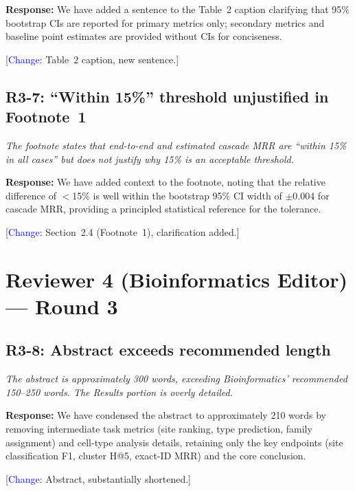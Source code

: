 \documentclass[11pt,a4paper]{article}
\begin{document}
\textbf{Response:} We have added a sentence to the Table~2 caption clarifying
that 95\% bootstrap CIs are reported for primary metrics only; secondary metrics
and baseline point estimates are provided without CIs for conciseness.

[\textcolor{blue}{Change:} Table~2 caption, new sentence.]

\subsection*{R3-7: ``Within 15\%'' threshold unjustified in Footnote~1}

\textit{The footnote states that end-to-end and estimated cascade MRR are
``within 15\% in all cases'' but does not justify why 15\% is an acceptable
threshold.}

\textbf{Response:} We have added context to the footnote, noting that the
relative difference of $<$15\% is well within the bootstrap 95\% CI width of
$\pm$0.004 for cascade MRR, providing a principled statistical reference for
the tolerance.

[\textcolor{blue}{Change:} Section~2.4 (Footnote~1), clarification added.]

\section*{Reviewer 4 (Bioinformatics Editor) --- Round 3}

\subsection*{R3-8: Abstract exceeds recommended length}

\textit{The abstract is approximately 300 words, exceeding Bioinformatics'
recommended 150--250 words. The Results portion is overly detailed.}

\textbf{Response:} We have condensed the abstract to approximately 210 words by
removing intermediate task metrics (site ranking, type prediction, family
assignment) and cell-type analysis details, retaining only the key endpoints
(site classification F1, cluster H@5, exact-ID MRR) and the core conclusion.

[\textcolor{blue}{Change:} Abstract, substantially shortened.]
\end{document}
